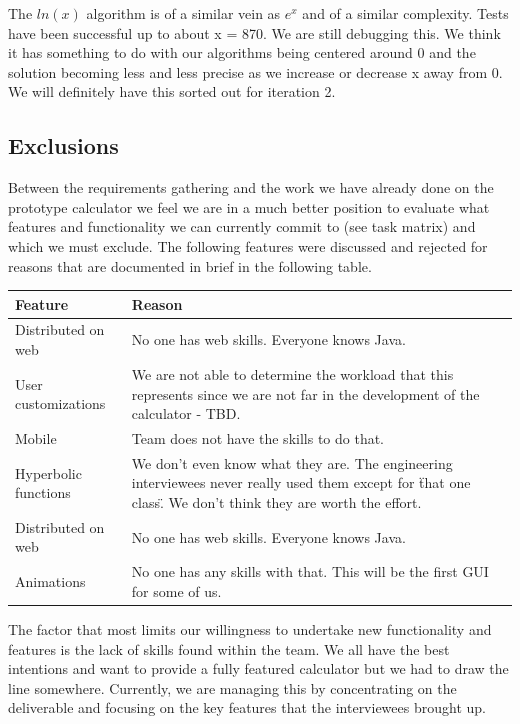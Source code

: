 \documentclass[a4paper]{article}
\begin{document}
The $ln(x)$ algorithm is of a similar vein as $e^x$ and of a similar complexity. Tests have been successful up to about x = 870. We are still debugging this. We think it has something to do with our algorithms being centered around 0 and the solution becoming less and less precise as we increase or decrease x away from 0. We will definitely have this sorted out for iteration 2.

\subsection{Exclusions}

Between the requirements gathering and the work we have already done on the prototype calculator we feel we are in a much better position to evaluate what features and functionality we can currently commit to (see task matrix) and which we must exclude. The following features were discussed and rejected for reasons that are documented in brief in the following table.
\bigskip

\begin{tabular}[!h]{|p{3.5cm} | p{10cm}|}
\hline 
\textbf{Feature} & \textbf{Reason} \\ 
\hline 
Distributed on web & No one has web skills. Everyone knows Java. \\ 
\hline
User customizations & We are not able to determine the workload that this represents since we are not far in the development of the calculator - TBD.  \\ 
\hline
Mobile & Team does not have the skills to do that. \\
\hline
Hyperbolic functions & We don't even know what they are. The engineering interviewees never really used them except for \"that one class\". We don't think they are worth the effort. \\
\hline
Distributed on web & No one has web skills. Everyone knows Java. \\ 
\hline
Animations & No one has any skills with that. This will be the first GUI for some of us. \\ 
\hline
\end{tabular} 
\bigskip

The factor that most limits our willingness to undertake new functionality and features is the lack of skills found within the team. We all have the best intentions and want to provide a fully featured calculator but we had to draw the line somewhere. Currently, we are managing this by concentrating on the deliverable and focusing on the key features that the interviewees brought up. \\
\end{document}
